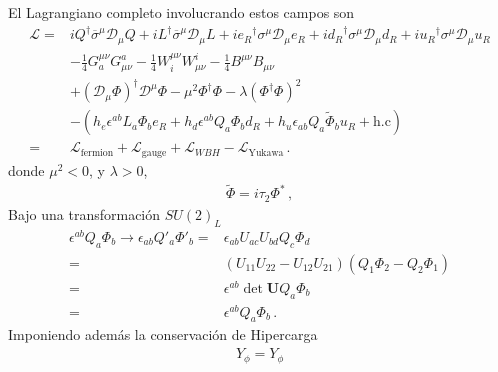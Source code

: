 \begin{frame}
El Lagrangiano completo involucrando estos campos son
\begin{align}
     \mathcal{L}=&i{Q}^{\dagger}\overline{\sigma}^\mu\mathcal{D}_\mu Q+i{L}^{\dagger}\overline{\sigma}^\mu\mathcal{D}_\mu L+
i{e_R}^{\dagger}\sigma^\mu\mathcal{D}_\mu {e_R}+i{d_R}^{\dagger}\sigma^\mu\mathcal{D}_\mu {d_R}+i{u_R}^{\dagger}\sigma^\mu\mathcal{D}_\mu {u_R}
\nonumber\\
     &-\tfrac{1}{4}G^{\mu\nu}_a G_{\mu\nu}^a-\tfrac{1}{4}W^{\mu\nu}_i W_{\mu\nu}^i-\tfrac{1}{4}B^{\mu\nu} B_{\mu\nu}\nonumber\\
     &+(\mathcal{D}_\mu\Phi)^\dagger\mathcal{D}^\mu\Phi-\mu^2\Phi^\dagger\Phi-\lambda(\Phi^\dagger\Phi)^2\nonumber\\
     &-(h_e \epsilon^{ab}L_a\Phi_b e_R+h_d \epsilon^{ab}Q_a\Phi_b d_R+h_u \epsilon_{ab}Q_a\widetilde{\Phi}_{b}u_R+\text{h.c})\nonumber\\
     =&\mathcal{L}_{\text{fermion}}+\mathcal{L}_{\text{gauge}}
     +\mathcal{L}_{WBH}
     -\mathcal{L}_{\text{Yukawa}}\,.
\end{align}
donde $\mu^2<0$, y $\lambda>0$,
\begin{align}
  \widetilde{\Phi}=i\tau_2\Phi^*\,,
\end{align}
Bajo una transformación $SU(2)_L$
\begin{align}
\epsilon^{ab}Q_a \Phi_b\to \epsilon_{ab}Q'_a \Phi'_b=&\epsilon_{ab}U_{ac}U_{bd}Q_c \Phi_d\nonumber\\
  =&\left( U_{11}U_{22}-U_{12}U_{21} \right)\left(Q_1\Phi_2-Q_2\Phi_1  \right)\nonumber\\
  =&\epsilon^{ab}\det\mathbf{U} Q_a \Phi_b\nonumber\\
  =&\epsilon^{ab} Q_a \Phi_b\,.
\end{align}
Imponiendo además la conservación de Hipercarga
\begin{align}
  Y_{\phi}=Y_{\phi}
\end{align}



\end{frame}
